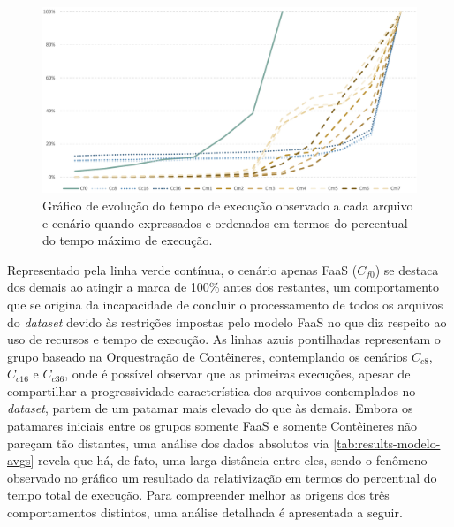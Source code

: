 \documentclass[english,brazilian]{UNISINOSmonografia} %
\newcommand\defaultFigureWidth{0.9}
\begin{document}
\begin{figure}[bt]
	\centering%
	\begin{minipage}{\defaultFigureWidth\textwidth}
		\caption{Gráfico de evolução do tempo de execução observado a cada arquivo e cenário quando expressados e ordenados em termos do percentual do tempo máximo de execução.}
		\label{fig:results-modelo-caracteristicas}
		\vspace{1ex}
		\includegraphics[width=\textwidth]{results-modelo-caracteristicas}
	\end{minipage}
\end{figure}



Representado pela linha verde contínua, o cenário apenas FaaS ($C_{f0}$) se destaca dos demais ao atingir a marca de 100\% antes dos restantes, um comportamento que se origina da incapacidade de concluir o processamento de todos os arquivos do \textit{dataset} devido às restrições impostas pelo modelo FaaS no que diz respeito ao uso de recursos e tempo de execução.
%
As linhas azuis pontilhadas representam o grupo baseado na Orquestração de Contêineres, contemplando os cenários {$C_{c8}$, $C_{c16}$ e $C_{c36}$}, onde é possível observar que as primeiras execuções, apesar de compartilhar a progressividade característica dos arquivos contemplados no \textit{dataset}, partem de um patamar mais elevado do que às demais.
%
Embora os patamares iniciais entre os grupos somente FaaS e somente Contêineres não pareçam tão distantes, uma análise dos dados absolutos via \autoref{tab:results-modelo-avgs} revela que há, de fato, uma larga distância entre eles, sendo o fenômeno observado no gráfico um resultado da relativização em termos do percentual do tempo total de execução.
%
Para compreender melhor as origens dos três comportamentos distintos, uma análise detalhada é apresentada a seguir.
\end{document}
